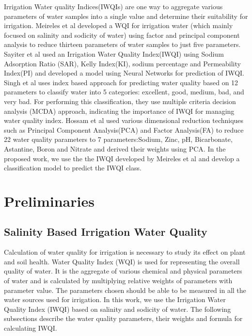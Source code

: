 \documentclass[conference]{IEEEtran}
\begin{document}
Irrigation Water quality Indices(IWQIs) are one way to aggregate various parameters of water samples into a single value and determine their suitability for irrigation. Meireles et al\cite{article:agricultureWQI} developed a WQI for irrigation water (which mainly focused on salinity and sodicity of water) using factor and principal component analysis to reduce thirteen parameters of water samples to just five parameters. Sayiter et al \cite{article:wqiModel1} used an Irrigation Water Quality Index(IWQI) using Sodium Adsorption Ratio (SAR), Kelly Index(KI), sodium percentage and Permeability Index(PI) and developed a model using Neural Networks for prediction of IWQI. Singh et al\cite{article:wqiModel2} uses index based approach for predicting water quality based on 12 parameters to classify water into 5 categories: excellent, good, medium, bad, and very bad. For performing this classification, they use multiple criteria decision analysis (MCDA) approach, indicating the importance of IWQI for managing water quality index. Hossam et al \cite{article:wqiModel3} used various dimensional reduction techniques such as Principal Component Analysis(PCA) and Factor Analysis(FA) to reduce 22 water quality parameters to 7 parameters:Sodium, Zinc, pH, Bicarbonate, Astantine, Boron and Nitrate and derived their weights using PCA. In the proposed work, we use the the IWQI developed by Meireles et al\cite{article:agricultureWQI} and develop a classification model to predict the IWQI class. 



\section{Preliminaries}
\label{section:preliminaries}

\subsection{Salinity Based Irrigation Water Quality}
\label{subsection:devIWQI}
Calculation of water quality for irrigation is necessary to study its effect on plant and soil health. Water Quality Index (WQI) is used for representing the overall quality of water. It is the aggregate of various chemical and physical parameters of water and is calculated by multiplying relative weights of parameters with parameter value. The parameters chosen should be able to be measured in all the water sources used for irrigation. In this work, we use the Irrigation Water Quality Index (IWQI) based on salinity and sodicity of water. The following subsections describe the water quality parameters, their weights and formula for calculating IWQI. 
\end{document}
